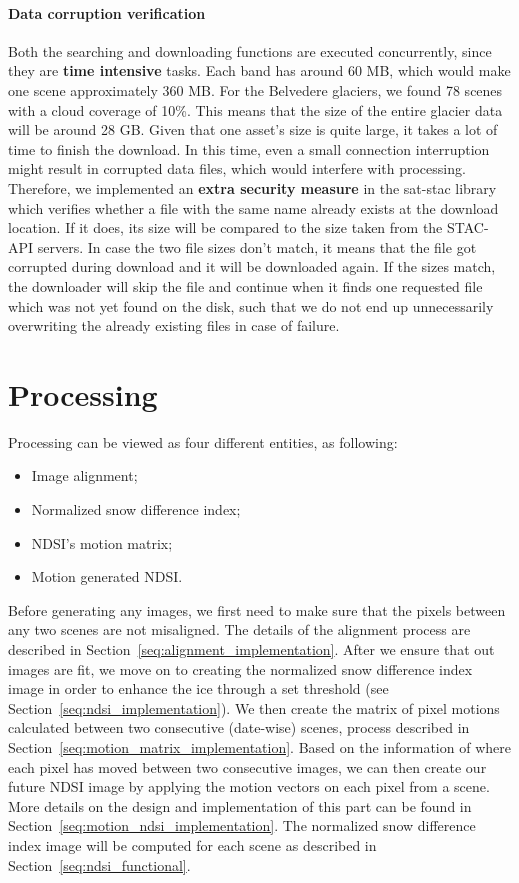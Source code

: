 \documentclass[11pt, a4paper]{report}
\begin{document}
	\paragraph{Data corruption verification}
	Both the searching and downloading functions are executed concurrently, since they are \textbf{time intensive} tasks. Each band has around 60 MB, which would make one scene approximately 360 MB. For the Belvedere glaciers, we found 78 scenes with a cloud coverage of 10\%. This means that the size of the entire glacier data will be around 28 GB. Given that one asset's size is quite large, it takes a lot of time to finish the download. In this time, even a small connection interruption might result in corrupted data files, which would interfere with processing. Therefore, we implemented an \textbf{extra security measure} in the sat-stac library which verifies whether a file with the same name already exists at the download location. If it does, its size will be compared to the size taken from the STAC-API servers. In case the two file sizes don't match, it means that the file got corrupted during download and it will be downloaded again. If the sizes match, the downloader will skip the file and continue when it finds one requested file which was not yet found on the disk, such that we do not end up unnecessarily overwriting the already existing files in case of failure.
	
	\section{Processing}
	\label{seq:processing}
	Processing can be viewed as four different entities, as following:
	\begin{itemize}
		\item Image alignment;
		\item Normalized snow difference index;
		\item NDSI's motion matrix;
		\item Motion generated NDSI.
	\end{itemize}
	Before generating any images, we first need to make sure that the pixels between any two scenes are not misaligned. The details of the alignment process are described in Section~\ref{seq:alignment_implementation}. After we ensure that out images are fit, we move on to creating the normalized snow difference index image in order to enhance the ice through a set threshold (see Section~\ref{seq:ndsi_implementation}). We then create the matrix of pixel motions calculated between two consecutive (date-wise) scenes, process described in Section~\ref{seq:motion_matrix_implementation}. Based on the information of where each pixel has moved between two consecutive images, we can then create our future NDSI image by applying the motion vectors on each pixel from a scene. More details on the design and implementation of this part can be found in Section~\ref{seq:motion_ndsi_implementation}.
	The normalized snow difference index image will be computed for each scene as described in Section~\ref{seq:ndsi_functional}.
	
\end{document}
